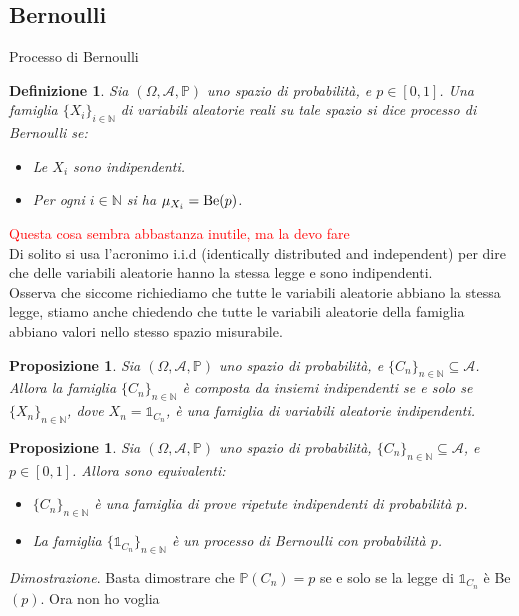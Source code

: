 \documentclass[11pt]{book}
\makeatletter
\theoremstyle{Definizione}
\newtheorem*{mydef}{Definizione}
\theoremstyle{TeoremaProposizioneLemmaCorollario}
\newtheorem{mypropo}[myteo]{Proposizione}
\theoremstyle{OsservazioneNota}
\renewenvironment{proof}[1][\proofname]{\par
  \normalfont \topsep6\p@\@plus6\p@\relax
  \trivlist
  \item[\hskip\labelsep
        \itshape
    #1\@addpunct{.}]\ignorespaces
}{%
  \endtrivlist\@endpefalse
}
\newcommand{\N}{\mathbb{N}}
\renewcommand{\P}{\mathbb{P}}
\newcommand{\uno}[1]{\mathds{1}_{#1}}
\renewenvironment{proof}{\textsl{Dimostrazione}.}{}
\makeatother
\begin{document}
\subsection{Bernoulli}
\begin{boxdef}{Processo di Bernoulli}
\begin{mydef}
Sia $(\Omega,\mathcal{A},\P)$ uno spazio di probabilità, e $p\in [0,1]$. Una famiglia $\{X_i\}_{i\in \N}$ di variabili aleatorie reali su tale spazio si dice processo di Bernoulli se:
\begin{itemize}
\item Le $X_i$ sono indipendenti.
\item Per ogni $i \in \N$ si ha $\mu_{X_i} = \textup{Be}(p)$.
\end{itemize}
\end{mydef}
\end{boxdef}
\noindent
\textcolor{red}{Questa cosa sembra abbastanza inutile, ma la devo fare}\\
Di solito si usa l'acronimo i.i.d (identically distributed and independent) per dire che delle variabili aleatorie hanno la stessa legge e sono indipendenti.\\
Osserva che siccome richiediamo che tutte le variabili aleatorie abbiano la stessa legge, stiamo anche chiedendo che tutte le variabili aleatorie della famiglia abbiano valori nello stesso spazio misurabile.
\begin{boxpro}
\begin{mypropo}
Sia $(\Omega,\mathcal{A},\P)$ uno spazio di probabilità, e $\{C_n\}_{n\in \N} \subseteq \mathcal{A}$. Allora la famiglia $\{C_n\}_{n \in \N}$ è composta da insiemi indipendenti se e solo se $\{X_n\}_{n\in \N}$, dove $X_n = \uno{C_n}$, è una famiglia di variabili aleatorie indipendenti.
\end{mypropo}
\end{boxpro}
\begin{boxpro}
\begin{mypropo}
Sia $(\Omega,\mathcal{A},\P)$ uno spazio di probabilità, $\{C_n\}_{n\in \N}\subseteq \mathcal{A}$, e $p\in [0,1]$. Allora sono equivalenti:
\begin{itemize}
\item[$(i)$] $\{C_n\}_{n\in \N}$ è una famiglia di prove ripetute indipendenti di probabilità $p$.
\item[$(ii)$] La famiglia $\{\uno{C_n}\}_{n\in \N}$ è un processo di Bernoulli con probabilità $p$.
\end{itemize}
\end{mypropo}
\tcblower
\begin{proof}
Basta dimostrare che $\P(C_n) = p$ se e solo se la legge di $\uno{C_n}$ è Be$(p)$. Ora non ho voglia	
\end{proof}
\end{boxpro}
\end{document}
